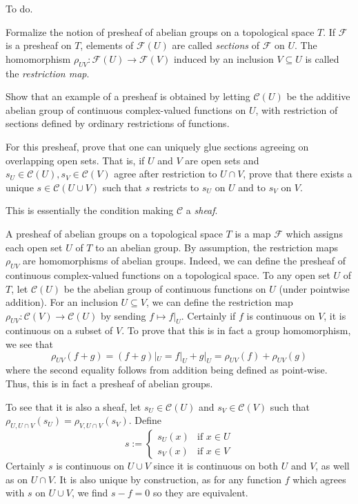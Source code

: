 \documentclass[../../master.tex]{subfiles}
\begin{document}
\begin{solution}
    To do.
\end{solution}

\begin{problem}
    Formalize the notion of presheaf of abelian groups on a topological space $T$.
    If $\mathscr{F}$ is a presheaf on $T$, elements of $\mathscr{F}(U)$ are called \textit{sections} of $\mathscr{F}$ on $U$.
    The homomorphism $\rho_{UV} : \mathscr{F}(U) \to \mathscr{F}(V)$ induced by an inclusion $V \subseteq U$ is called the \textit{restriction map}.

    Show that an example of a presheaf is obtained by letting $\mathscr{C}(U)$ be the additive abelian group of continuous complex-valued functions on $U$, with restriction of sections defined by ordinary restrictions of functions.

    For this presheaf, prove that one can uniquely glue sections agreeing on overlapping open sets.
    That is, if $U$ and $V$ are open sets and $s_U \in \mathscr{C}(U), s_V \in \mathscr{C}(V)$ agree after restriction to $U \cap V$, prove that there exists a unique $s \in \mathscr{C}(U \cup V)$ such that $s$ restricts to $s_U$ on $U$ and to $s_V$ on $V$.

    This is essentially the condition making $\mathscr{C}$ a \textit{sheaf}.
\end{problem}

\begin{solution}
    A presheaf of abelian groups on a topological space $T$ is a map $\mathscr{F}$ which assigns each open set $U$ of $T$ to an abelian group.
    By assumption, the restriction maps $\rho_{UV}$ are homomorphisms of abelian groups.
    Indeed, we can define the presheaf of continuous complex-valued functions on a topological space.
    To any open set $U$ of $T$, let $\mathscr{C}(U)$ be the abelian group of continuous functions on $U$ (under pointwise addition).
    For an inclusion $U \subseteq V$, we can define the restriction map $\rho_{UV}: \mathscr{C}(V) \to \mathscr{C}(U)$ by sending $f \mapsto f|_U$.
    Certainly if $f$ is continuous on $V$, it is continuous on a subset of $V$.
    To prove that this is in fact a group homomorphism, we see that
    \[
        \rho_{UV} (f + g) = (f + g)|_{U} = f|_{U} + g|_{U} = \rho_{UV}(f) + \rho_{UV}(g)
    \]
    where the second equality follows from addition being defined as point-wise.
    Thus, this is in fact a presheaf of abelian groups.

    To see that it is also a sheaf, let $s_U \in \mathscr{C}(U)$ and $s_V \in \mathscr{C}(V)$ such that $\rho_{U, U \cap V}(s_U) = \rho_{V, U \cap V}(s_V)$.
    Define
    \[
    s := 
    \begin{cases}
        s_U(x) & \text{if $x \in U$} \\
        s_V(x) & \text{if $x \in V$}
    \end{cases}
    \]
    Certainly $s$ is continuous on $U \cup V$ since it is continuous on both $U$ and $V$, as well as on $U \cap V$.
    It is also unique by construction, as for any function $f$ which agrees with $s$ on $U \cup V$, we find $s - f = 0$ so they are equivalent.
\end{solution}
\end{document}
